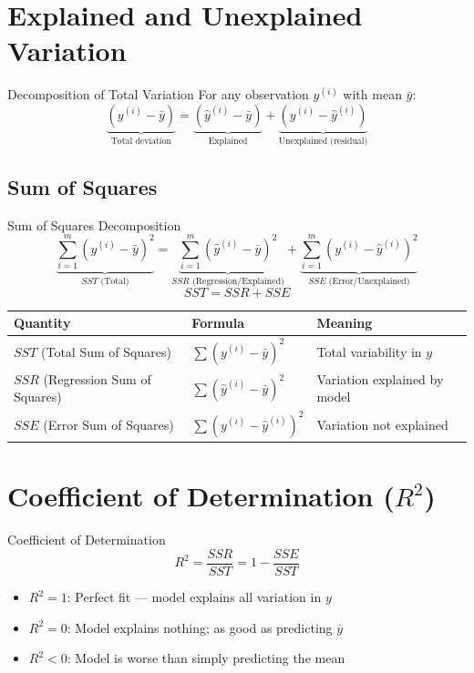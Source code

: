 \documentclass[12pt,a4paper]{report}
\begin{document}
\section{Explained and Unexplained Variation}

\begin{defbox}{Decomposition of Total Variation}
For any observation $y^{(i)}$ with mean $\bar{y}$:
\[
\underbrace{(y^{(i)} - \bar{y})}_{\text{Total deviation}} = \underbrace{(\hat{y}^{(i)} - \bar{y})}_{\text{Explained}} + \underbrace{(y^{(i)} - \hat{y}^{(i)})}_{\text{Unexplained (residual)}}
\]
\end{defbox}

\subsection{Sum of Squares}

\begin{formulabox}{Sum of Squares Decomposition}
\[
\underbrace{\sum_{i=1}^m (y^{(i)} - \bar{y})^2}_{SST \text{ (Total)}} = \underbrace{\sum_{i=1}^m (\hat{y}^{(i)} - \bar{y})^2}_{SSR \text{ (Regression/Explained)}} + \underbrace{\sum_{i=1}^m (y^{(i)} - \hat{y}^{(i)})^2}_{SSE \text{ (Error/Unexplained)}}
\]
\[
SST = SSR + SSE
\]
\end{formulabox}

\begin{center}
\begin{tabular}{lll}
\toprule
\textbf{Quantity} & \textbf{Formula} & \textbf{Meaning} \\
\midrule
$SST$ (Total Sum of Squares) & $\sum (y^{(i)} - \bar{y})^2$ & Total variability in $y$ \\
$SSR$ (Regression Sum of Squares) & $\sum (\hat{y}^{(i)} - \bar{y})^2$ & Variation explained by model \\
$SSE$ (Error Sum of Squares) & $\sum (y^{(i)} - \hat{y}^{(i)})^2$ & Variation not explained \\
\bottomrule
\end{tabular}
\end{center}

\section{Coefficient of Determination ($R^2$)}

\begin{formulabox}{Coefficient of Determination}
\[
R^2 = \frac{SSR}{SST} = 1 - \frac{SSE}{SST}
\]
\begin{itemize}[noitemsep]
  \item $R^2 = 1$: Perfect fit --- model explains all variation in $y$
  \item $R^2 = 0$: Model explains nothing; as good as predicting $\bar{y}$
  \item $R^2 < 0$: Model is worse than simply predicting the mean
\end{itemize}
\end{formulabox}
\end{document}
